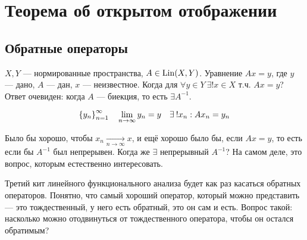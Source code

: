 \documentclass[document]{subfiles}
\begin{document}
\chapter{Теорема об открытом отображении}
\section{Обратные операторы}

$X,Y$ --- нормированные пространства, $A \in \operatorname{Lin}(X,Y)$. Уравнение $Ax = y$, где $y$ --- дано, $A$ --- дан, $x$ --- неизвестное.
Когда для $\forall y \in Y \: \exists! x \in X$ т.ч. $Ax = y$? Ответ очевиден: когда  $A$ --- биекция, то есть $\exists A^{-1}$. 

\[ \seq{y_n}^\infty_{n=1} \quad \liml_{n \to \infty} y_n = y \quad \exists! x_n : Ax_n = y_n \] 

Было бы хорошо, чтобы $x_n \underset{n \to \infty}{\longrightarrow} x$, и ещё хорошо было бы, если $Ax = y$, то есть если бы $A^{-1}$ был непрерывен. Когда же $\exists$ непрерывный $A^{-1}$? На самом деле, это вопрос, которым естественно интересовать.



Третий кит линейного функционального анализа будет как раз касаться обратных операторов. Понятно, что самый хороший оператор, который можно представить --- это тождественный, у него есть обратный, это он сам и есть.
 Вопрос такой: насколько можно отодвинуться от тождественного оператора, чтобы он остался обратимым?
\end{document}
